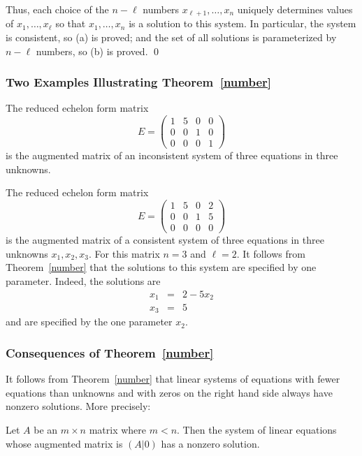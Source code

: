 Thus, each choice of the $n-\ell$ numbers
$x_{\ell+1},\ldots,x_n$ uniquely determines values of
$x_1,\ldots,x_\ell$ so that $x_1,\ldots,x_n$ is a solution to
this system.  In particular, the system is consistent, so (a) is
proved; and the set of all solutions is parameterized by
$n-\ell$ numbers, so (b) is proved.  \qed

\subsubsection*{Two Examples Illustrating Theorem~\ref{number}}

The reduced echelon form matrix
\[
E = \left(\begin{array}{ccc|c} 1 & 5 & 0 & 0 \\ 0 & 0 & 1 & 0\\
	0 & 0 & 0 & 1 \end{array}\right)
\]
is the augmented matrix of an inconsistent system of three equations
in three unknowns.

The reduced echelon form matrix
\[
E = \left(\begin{array}{ccc|c} 1 & 5 & 0 & 2 \\ 0 & 0 & 1 & 5\\
	0 & 0 & 0 & 0 \end{array}\right)
\]
is the augmented matrix of a consistent system of three equations
in three unknowns $x_1,x_2,x_3$.  For this matrix $n=3$ and $\ell=2$.
It follows from Theorem~\ref{number} that the solutions to this system
are specified by one parameter.  Indeed, the solutions are
\begin{eqnarray*}
x_1 & = & 2 - 5x_2\\
x_3 & = & 5
\end{eqnarray*}
and are specified by the one parameter $x_2$.


\subsubsection*{Consequences of Theorem~\ref{number}}

It follows from Theorem~\ref{number} that linear systems of equations
with fewer equations than unknowns and with zeros on the right hand
side always have nonzero solutions.  More precisely:
\begin{cor}  \label{existencehomo}
Let $A$ be an $m\times n$ matrix where $m<n$.  Then the system of
linear equations whose augmented matrix is $(A|0)$ has a nonzero
solution.
\end{cor}

